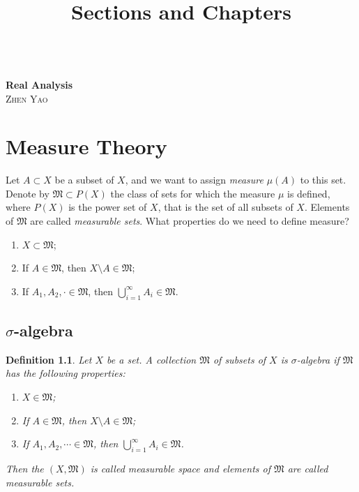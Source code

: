 \documentclass[11pt]{book}
\title{Sections and Chapters}
\newtheorem{definition}{Definition}[chapter]
\theoremstyle{definition}
\numberwithin{equation}{chapter}
\def\MM{\mathfrak{M}}
\begin{document}
\frontmatter

\begin{titlepage}
	\begin{center}
	\textbf{\LARGE{}} \\
	\vspace{40mm}
    \textbf{\Huge{Real Analysis}} \\
    \medskip
    \vspace{10mm} %
    \large{\textsc{Zhen Yao}}\\
    \end{center}
\end{titlepage}

\tableofcontents{}
\mainmatter

\newpage

\chapter{Measure Theory}

Let $A \subset X$ be a subset of $X$, and we want to assign {\em measure} $\mu(A)$ to this set. Denote by $\MM \subset P(X)$ the class of sets for which the measure $\mu$ is defined, where $P(X)$ is the power set of $X$, that is the set of all subsets of $X$. Elements of $\MM$ are called {\em measurable sets}. What properties do we need to define measure?
\begin{enumerate}[label=(\alph*)]
    \item $X \subset \MM$;
    
    \item If $A \in \MM$, then $X \setminus A \in \MM$;
    
    \item If $A_1, A_2, \cdot \in \MM$, then $\bigcup^\infty_{i=1}A_i \in \MM$.
\end{enumerate}

\medskip

\section{$\sigma$-algebra}

\begin{definition}\label{definition_11}
Let $X$ be a set. A collection $\MM$ of subsets of $X$ is $\sigma$-algebra if $\MM$ has the following properties:
\begin{enumerate}[label=(\alph*)]
    \item $X \in \MM$;
    
    \item If $A \in \MM$, then $X \setminus A \in \MM$;
    
    \item If $A_1, A_2, \cdots \in \MM$, then $\bigcup^\infty_{i=1}A_i \in \MM$.
\end{enumerate}
Then the $(X,\MM)$ is called measurable space and elements of $\MM$ are called measurable sets.
\end{definition}
\end{document}
